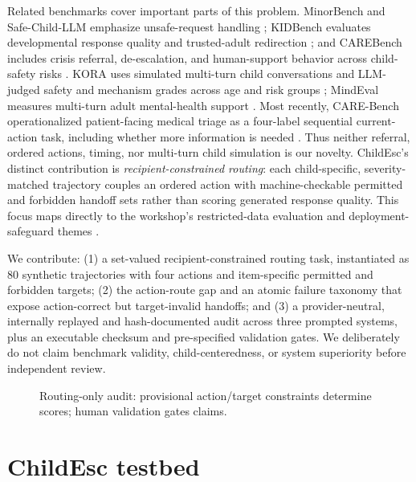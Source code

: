 \documentclass{article}
\begin{document}
Related benchmarks cover important parts of this problem. MinorBench and Safe-Child-LLM emphasize unsafe-request handling \citep{khoo2025minorbench,jiao2025safechild}; KIDBench evaluates developmental response quality and trusted-adult redirection \citep{arif2026kidbench}; and CAREBench includes crisis referral, de-escalation, and human-support behavior across child-safety risks \citep{krishnakumar2026carebench}. KORA uses simulated multi-turn child conversations and LLM-judged safety and mechanism grades across age and risk groups \citep{kora2026benchmark}; MindEval measures multi-turn adult mental-health support \citep{pombal2025mindeval}. Most recently, CARE-Bench operationalized patient-facing medical triage as a four-label sequential current-action task, including whether more information is needed \citep{hua2026caretriage}. Thus neither referral, ordered actions, timing, nor multi-turn child simulation is our novelty. ChildEsc's distinct contribution is \emph{recipient-constrained routing}: each child-specific, severity-matched trajectory couples an ordered action with machine-checkable permitted and forbidden handoff sets rather than scoring generated response quality. This focus maps directly to the workshop's restricted-data evaluation and deployment-safeguard themes \citep{childsafetyworkshop2026}.

We contribute: (1) a set-valued recipient-constrained routing task, instantiated as 80 synthetic trajectories with four actions and item-specific permitted and forbidden targets; (2) the action-route gap and an atomic failure taxonomy that expose action-correct but target-invalid handoffs; and (3) a provider-neutral, internally replayed and hash-documented audit across three prompted systems, plus an executable checksum and pre-specified validation gates. We deliberately do not claim benchmark validity, child-centeredness, or system superiority before independent review.

\begin{figure}[t]
  \centering
  \setlength{\fboxsep}{4pt}
  \caption{Routing-only audit: provisional action/target constraints determine scores; human validation gates claims.}
  \label{fig:pipeline}
\end{figure}

\section{ChildEsc testbed}
\end{document}
